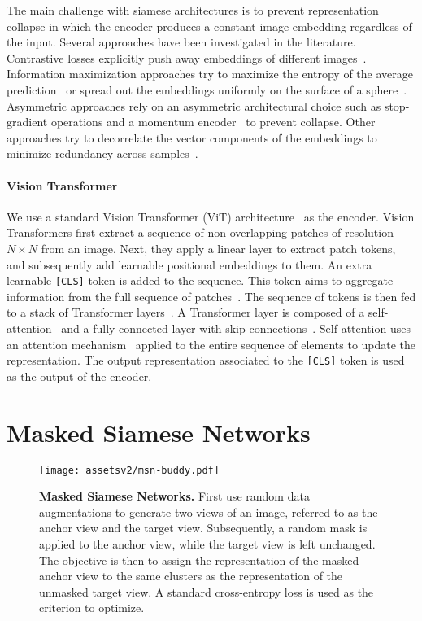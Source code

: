\documentclass{article}
\begin{document}
The main challenge with siamese architectures is to prevent representation collapse in which the encoder produces a constant image embedding regardless of the input.
Several approaches have been investigated in the literature. Contrastive losses explicitly push away embeddings of different images~\citep{bromley1993signature,he2019moco,chen2020exploring}. Information maximization approaches try to maximize the entropy of the average prediction~\citep{caron2021emerging,assran2021semi} or spread out the embeddings uniformly on the surface of a sphere~\citep{caron2020unsupervised}.
Asymmetric approaches rely on an asymmetric architectural choice such as stop-gradient operations and a momentum encoder~\citep{chen2020exploring,grill2020bootstrap} to prevent collapse.
Other approaches try to decorrelate the vector components of the embeddings to minimize redundancy across samples~\citep{zbontar2021barlow,bardes2021vicreg}.

\paragraph{Vision Transformer}
We use a standard Vision Transformer (ViT) architecture~\citep{dosovitskiy2020image} as the encoder.
Vision Transformers first extract a sequence of non-overlapping patches of resolution $N \times N$ from an image.
Next, they apply a linear layer to extract patch tokens, and subsequently add learnable positional embeddings to them.
An extra learnable {\tt [CLS]} token is added to the sequence.
This token aims to aggregate information from the full sequence of patches~\citep{dosovitskiy2020image,caron2021emerging}.
The sequence of tokens is then fed to a stack of Transformer layers~\citep{vaswani2017attention}.
A Transformer layer is composed of a self-attention~\citep{vaswani2017attention} and a fully-connected layer with skip connections~\citep{he2016deep}.
Self-attention uses an attention mechanism~\citep{bahdanau2014neural} applied to the entire sequence of elements to update the representation.
The output representation associated to the {\tt [CLS]} token is used as the output of the encoder.

\section{Masked Siamese Networks}
\label{sec:methodology}

\begin{figure}[t]
    \centering
    \texttt{[image: assetsv2/msn-buddy.pdf]}
    \caption{{\bf Masked Siamese Networks.} First use random data augmentations to generate two views of an image, referred to as the anchor view and the target view. Subsequently, a random mask is applied to the anchor view, while the target view is left unchanged. The objective is then to assign the representation of the masked anchor view to the same clusters as the representation of the unmasked target view. A standard cross-entropy loss is used as the criterion to optimize.}
    \label{fig:msn}
\end{figure}
\end{document}
